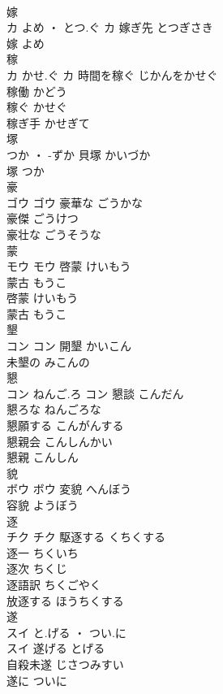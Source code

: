 \documentclass[8pt]{extreport}
\begin{document}
\begin{CJK}{UTF8}{min}
\\	嫁	
\\	カ	よめ ・ とつ.ぐ	カ	嫁ぎ先	とつぎさき	
\\	嫁	よめ	
\\	稼	
\\	カ	かせ.ぐ	カ	時間を稼ぐ	じかんをかせぐ	
\\	稼働	かどう	
\\	稼ぐ	かせぐ	
\\	稼ぎ手	かせぎて	
\\	塚	
\\	つか ・ -ずか		貝塚	かいづか	
\\	塚	つか	
\\	豪	
\\	ゴウ		ゴウ	豪華な	ごうかな	
\\	豪傑	ごうけつ	
\\	豪壮な	ごうそうな	
\\	蒙	
\\	モウ		モウ	啓蒙	けいもう	
\\	蒙古	もうこ	
\\	啓蒙	けいもう	
\\	蒙古	もうこ	
\\	墾	
\\	コン		コン	開墾	かいこん	
\\	未墾の	みこんの	
\\	懇	
\\	コン	ねんご.ろ	コン	懇談	こんだん	
\\	懇ろな	ねんごろな	
\\	懇願する	こんがんする	
\\	懇親会	こんしんかい	
\\	懇親	こんしん	
\\	貌	
\\	ボウ		ボウ	変貌	へんぼう	
\\	容貌	ようぼう	
\\	逐	
\\	チク		チク	駆逐する	くちくする	
\\	逐一	ちくいち	
\\	逐次	ちくじ	
\\	逐語訳	ちくごやく	
\\	放逐する	ほうちくする	
\\	遂	
\\	スイ	と.げる ・ つい.に
\\	スイ	遂げる	とげる	
\\	自殺未遂	じさつみすい	
\\	遂に	ついに	

\end{CJK}
\end{document}
